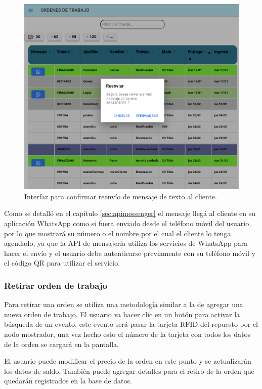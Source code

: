 \begin{figure}[H]
	\centering
	\includegraphics[scale=.35]{./Figures/listado-3.png}
	\caption{Interfaz para confirmar reenvío de mensaje de texto al cliente.}
	\label{fig:listado3}
\end{figure}

Como se detalló en el capítulo \ref{sec:apimessenger} el mensaje llegá al cliente en su aplicación WhatsApp como si fuera enviado desde el teléfono móvil del usuario, por lo que mostrará su número o el nombre por el cual el cliente lo tenga agendado, ya que la API de mensajería utiliza los servicios de WhatsApp para hacer el envío y el usuario debe autenticarse previamente con su teléfono móvil y el código QR para utilizar el servicio.

\subsubsection{Retirar orden de trabajo}
\label{subsubsec:frontretirar}

Para retirar una orden se utiliza una metodología similar a la de agregar una nueva orden de trabajo. El usuario va hacer clic en un botón para activar la búsqueda de un evento, este evento será pasar la tarjeta RFID del repuesto por el nodo mostrador, una vez hecho esto el número de la tarjeta con todos los datos de la orden se cargará en la pantalla. 

El usuario puede modificar el precio de la orden en este punto y se actualizarán los datos de saldo. También puede agregar detalles para el retiro de la orden que quedarán registrados en la base de datos.

